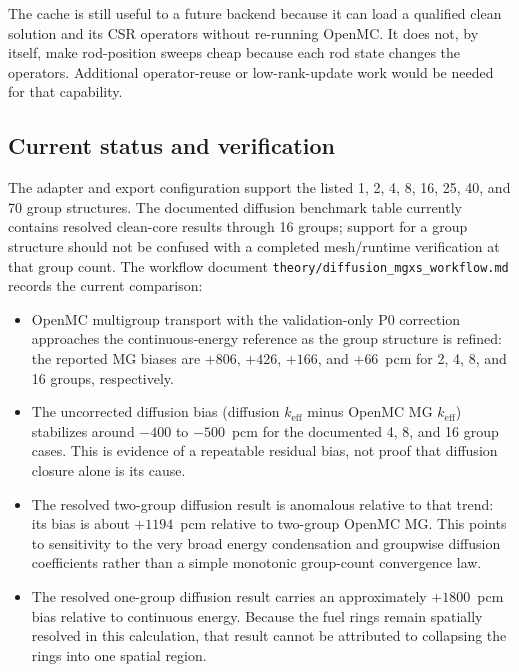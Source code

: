 \documentclass[11pt]{article}
\begin{document}
The cache is still useful to a future backend because it can load a qualified
clean solution and its CSR operators without re-running OpenMC.  It does not,
by itself, make rod-position sweeps cheap because each rod state changes the
operators.  Additional operator-reuse or low-rank-update work would be needed
for that capability.

\subsection{Current status and verification}

The adapter and export configuration support the listed 1, 2, 4, 8, 16, 25,
40, and 70 group structures.  The documented diffusion benchmark table
currently contains resolved clean-core results through 16 groups; support for a
group structure should not be confused with a completed mesh/runtime
verification at that group count.  The workflow document
\texttt{theory/diffusion\_mgxs\_workflow.md} records the current comparison:

\begin{itemize}
  \item OpenMC multigroup transport with the validation-only P0 correction
        approaches the continuous-energy reference as the group structure is
        refined: the reported MG biases are $+806$, $+426$, $+166$, and
        $+66$~pcm for 2, 4, 8, and 16 groups, respectively.
  \item The uncorrected diffusion bias (diffusion $k_{\mathrm{eff}}$ minus
        OpenMC MG $k_{\mathrm{eff}}$) stabilizes around $-400$ to $-500$~pcm
        for the documented 4, 8, and 16 group cases.  This is evidence of a
        repeatable residual bias, not proof that diffusion closure alone is
        its cause.
  \item The resolved two-group diffusion result is anomalous relative to that
        trend: its bias is about $+1194$~pcm relative to two-group OpenMC MG.
        This points to sensitivity to the very broad energy condensation and
        groupwise diffusion coefficients rather than a simple monotonic
        group-count convergence law.
  \item The resolved one-group diffusion result carries an approximately
        $+1800$~pcm bias relative to continuous energy.  Because the fuel rings
        remain spatially resolved in this calculation, that result cannot be
        attributed to collapsing the rings into one spatial region.
\end{itemize}
\end{document}

